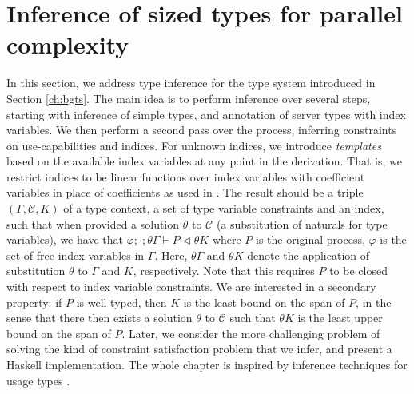 \section{Inference of sized types for parallel complexity}\label{ch:timeinference}

In this section, we address type inference for the type system introduced in Section \ref{ch:bgts}. The main idea is to perform inference over several steps, starting with inference of simple types, and annotation of server types with index variables. We then perform a second pass over the process, inferring constraints on use-capabilities and indices. For unknown indices, we introduce \textit{templates} based on the available index variables at any point in the derivation. That is, we restrict indices to be linear functions over index variables with coefficient variables in place of coefficients as used in \cite{HofmannAndJost2003,HofmannAndHoffmann2010,HoffmannEtAl2012}. The result should be a triple $(\Gamma,\mathcal{C},K)$ of a type context, a set of type variable constraints and an index, such that when provided a solution $\theta$ to $\mathcal{C}$ (a substitution of naturals for type variables), we have that $\varphi;\cdot;\theta\Gamma\vdash P \triangleleft \theta K$ where $P$ is the original process, $\varphi$ is the set of free index variables in $\Gamma$. Here, $\theta\Gamma$ and $\theta K$ denote the application of substitution $\theta$ to $\Gamma$ and $K$, respectively. Note that this requires $P$ to be closed with respect to index variable constraints. We are interested in a secondary property: if $P$ is well-typed, then $K$ is the least bound on the span of $P$, in the sense that there then exists a solution $\theta$ to $\mathcal{C}$ such that $\theta K$ is the least upper bound on the span of $P$. Later, we consider the more challenging problem of solving the kind of constraint satisfaction problem that we infer, and present a Haskell implementation. The whole chapter is inspired by inference techniques for usage types \cite{KobayashiEtAl2000,Kobayashi2005}.
%
